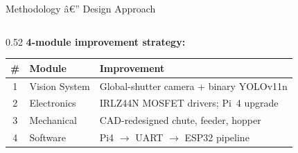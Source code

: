 \documentclass[aspectratio=169, 11pt]{beamer}
\begin{document}
\begin{frame}{Methodology â€” Design Approach}
\begin{columns}[T]
  \begin{column}{0.52\textwidth}
    \textbf{4-module improvement strategy:}
    \vspace{0.3em}

    \begin{tabular}{@{}clp{4.0cm}@{}}
      \toprule
      \textbf{\#} & \textbf{Module} & \textbf{Improvement}\\
      \midrule
      1 & Vision System   & Global-shutter camera + binary YOLOv11n\\
      2 & Electronics     & IRLZ44N MOSFET drivers; Pi~4 upgrade\\
      3 & Mechanical      & CAD-redesigned chute, feeder, hopper\\
      4 & Software        & Pi4 $\rightarrow$ UART $\rightarrow$ ESP32 pipeline\\
      \bottomrule
    \end{tabular}


\end{column}
\end{columns}
\end{frame}
\end{document}
